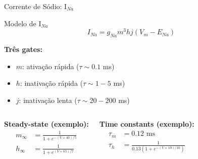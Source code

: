 \begin{frame}{Corrente de Sódio: I$_{Na}$}
\begin{block}{Modelo de I$_{Na}$}
\begin{equation*}
I_{Na} = g_{Na} m^3 h j (V_m - E_{Na})
\end{equation*}

\textbf{Três gates:}
\begin{itemize}
    \item $m$: ativação rápida ($\tau \sim 0.1$ ms)
    \item $h$: inativação rápida ($\tau \sim 1-5$ ms)
    \item $j$: inativação lenta ($\tau \sim 20-200$ ms)
\end{itemize}
\end{block}

\vspace{0.3cm}

\begin{columns}
\textbf{Steady-state (exemplo):}
\begin{align*}
m_\infty &= \frac{1}{1 + e^{-(V+40)/5}} \\
h_\infty &= \frac{1}{1 + e^{(V+65)/7}}
\end{align*}

\textbf{Time constants (exemplo):}
\begin{align*}
\tau_m &= 0.12 \text{ ms} \\
\tau_h &= \frac{1}{0.13(1+e^{-(V+10)/10})}
\end{align*}
\end{columns}

\vspace{0.3cm}

\end{frame}

